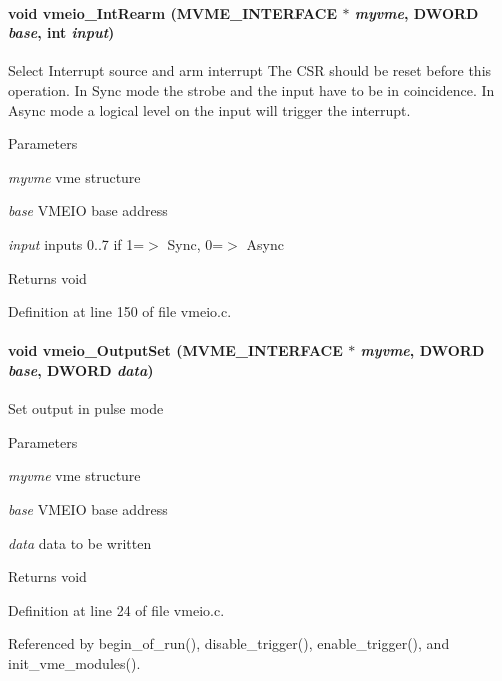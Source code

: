 \paragraph[{vmeio\_\-IntRearm}]{\setlength{\rightskip}{0pt plus 5cm}void vmeio\_\-IntRearm ({\bf MVME\_\-INTERFACE} $\ast$ {\em myvme}, \/  {\bf DWORD} {\em base}, \/  int {\em input})}\hfill\label{vmeio_8h_a5d16a82b1b6620fc8c2622682c32182b}
Select Interrupt source and arm interrupt The CSR should be reset before this operation. In Sync mode the strobe and the input have to be in coincidence. In Async mode a logical level on the input will trigger the interrupt. 
\begin{DoxyParams}{Parameters}
\item[{\em myvme}]vme structure \item[{\em base}]VMEIO base address \item[{\em input}]inputs 0..7 if 1=$>$ Sync, 0=$>$ Async \end{DoxyParams}
\begin{DoxyReturn}{Returns}
void 
\end{DoxyReturn}


Definition at line 150 of file vmeio.c.
\paragraph[{vmeio\_\-OutputSet}]{\setlength{\rightskip}{0pt plus 5cm}void vmeio\_\-OutputSet ({\bf MVME\_\-INTERFACE} $\ast$ {\em myvme}, \/  {\bf DWORD} {\em base}, \/  {\bf DWORD} {\em data})}\hfill\label{vmeio_8h_a87be831df449180bb5b3da3c35b8e714}
Set output in pulse mode 
\begin{DoxyParams}{Parameters}
\item[{\em myvme}]vme structure \item[{\em base}]VMEIO base address \item[{\em data}]data to be written \end{DoxyParams}
\begin{DoxyReturn}{Returns}
void 
\end{DoxyReturn}


Definition at line 24 of file vmeio.c.

Referenced by begin\_\-of\_\-run(), disable\_\-trigger(), enable\_\-trigger(), and init\_\-vme\_\-modules().
